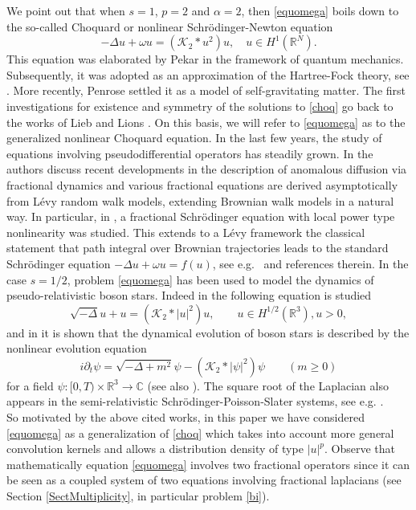 \documentclass[10pt]{amsart}
\numberwithin{equation}{section}
\begin{document}
\noindent We point out that when $s=1$, $p=2$ and  $\alpha=2$, then \eqref{equomega} boils down to the so-called Choquard or nonlinear Schr\"odinger-Newton equation
\begin{equation}
\label{choq} 
-\Delta u +\omega u=({\mathcal K}_2*u^2 )u,
\quad u\in H^1({{\mathbb R}}^N).
\end{equation}
This equation was elaborated by
Pekar \cite{pekar} in the framework of quantum mechanics.
Subsequently, it was adopted as an approximation of the Hartree-Fock
theory, see  \cite{Bong}. More recently, Penrose \cite{penrose} settled it as a model of self-gravitating matter.
The first investigations for existence and symmetry of the solutions to \eqref{choq} go back 
to the works of Lieb and Lions \cite{Lieb,Lions-ch}.
On this basis, we will refer to \eqref{equomega} as to the generalized nonlinear Choquard equation. 
In the last few years, the study of equations involving pseudodifferential operators has steadily grown. 
In \cite{metkla1,metkla2} the authors discuss recent developments in the description of anomalous diffusion via fractional dynamics and various fractional 
equations are derived asymptotically from L\'evy random walk models, extending
Brownian walk models in a natural way. In particular, in \cite{laskin}, a fractional Schr\"odinger equation with local power type nonlinearity was studied. This extends to a L\'evy framework the classical statement that path integral over Brownian trajectories leads to
the standard Schr\"odinger equation $-\Delta u+\omega u=f(u)$, see e.g.\ \cite{cazenave} and references therein. In the case $s=1/2$, problem \eqref{equomega} has been used to model the dynamics of pseudo-relativistic boson stars.
Indeed in \cite{boson} the following equation is studied
\begin{equation*}
\label{bosonstar}
\sqrt{-\Delta} u + u = (\mathcal{K}_2* |u|^2) u,
\qquad
u \in H^{1/2}(\mathbb{R}^3), u > 0, 
\end{equation*}
and in \cite{ElSc} it is shown that  the dynamical evolution of boson stars is  described
by the nonlinear evolution equation 
\begin{equation*}
\label{bosonstarm}
i\partial_t \psi= \sqrt{-\Delta + m^2} \psi - (\mathcal{K}_2* |\psi|^2) \psi \qquad (m\geq0)
\end{equation*}
for a field $\psi : [0, T ) \times \mathbb{R}^3 \to \mathbb{C}$
(see also \cite{FJL1,FJL2,lenzmann}).
The square root of the Laplacian also appears in the semi-relativistic
Schr\"odinger-Poisson-Slater systems, see e.g. \cite{JTN}. \\
\noindent So motivated by the above cited works, in this paper
we have considered \eqref{equomega} as a generalization of    \eqref{choq}
which takes into account more general convolution kernels and allows a 
distribution density of type $|u|^{p}$. Observe that mathematically
equation \eqref{equomega} involves two fractional operators since it can be seen as
a coupled system of two equations involving fractional laplacians (see Section \ref{SectMultiplicity},
in particular problem \eqref{bi}).
\end{document}
